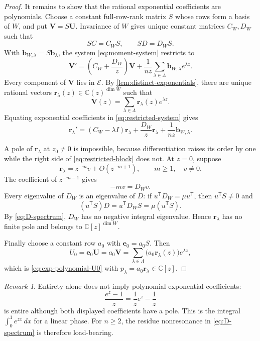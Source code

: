 \documentclass[11pt]{article}
\numberwithin{equation}{section}
\theoremstyle{definition}
\theoremstyle{remark}
\newtheorem{remark}[remark]{Remark}
\newcommand{\C}{\mathbb C}
\newcommand{\Ecal}{\mathcal E}
\begin{document}
\begin{proof}
It remains to show that the rational exponential coefficients are
polynomials.  Choose a constant full-row-rank matrix $S$ whose rows form a
basis of $W$, and put $\mathbf V=S\mathbf U$.  Invariance of $W$ gives unique
constant matrices $C_W,D_W$ such that
\[
  SC=C_WS,
  \qquad
  SD=D_WS.
\]
With $\mathbf b_{W,\lambda}=S\mathbf b_\lambda$, the system
\eqref{eq:moment-system} restricts to
\begin{equation}\label{eq:restricted-system}
  \mathbf V'
  =\left(C_W+\frac{D_W}{z}\right)\mathbf V
   +\frac1{nz}\sum_{\lambda\in\Lambda}
     \mathbf b_{W,\lambda}e^{\lambda z}.
\end{equation}
Every component of $\mathbf V$ lies in $\Ecal$.  By
\cref{lem:distinct-exponentials}, there are unique rational vectors
$\mathbf r_\lambda(z)\in\C(z)^{\dim W}$ such that
\begin{equation}\label{eq:V-expansion}
  \mathbf V(z)=\sum_{\lambda\in\Lambda}
  \mathbf r_\lambda(z)e^{\lambda z}.
\end{equation}
Equating exponential coefficients in \eqref{eq:restricted-system} gives
\begin{equation}\label{eq:restricted-block}
  \mathbf r_\lambda'
  =(C_W-\lambda I)\mathbf r_\lambda
   +\frac{D_W}{z}\mathbf r_\lambda
   +\frac1{nz}\mathbf b_{W,\lambda}.
\end{equation}

A pole of $\mathbf r_\lambda$ at $z_0\ne0$ is impossible, because
differentiation raises its order by one while the right side of
\eqref{eq:restricted-block} does not.  At $z=0$, suppose
\[
  \mathbf r_\lambda=z^{-m}v+O(z^{-m+1}),
  \qquad m\ge1,
  \quad v\ne0.
\]
The coefficient of $z^{-m-1}$ gives
\[
  -mv=D_Wv.
\]
Every eigenvalue of $D_W$ is an eigenvalue of $D$: if
$u^{\mathsf T}D_W=\mu u^{\mathsf T}$, then
$u^{\mathsf T}S\ne0$ and
\[
  (u^{\mathsf T}S)D
  =u^{\mathsf T}D_WS
  =\mu(u^{\mathsf T}S).
\]
By \eqref{eq:D-spectrum}, $D_W$ has no negative integral eigenvalue.  Hence
$\mathbf r_\lambda$ has no finite pole and belongs to
$\C[z]^{\dim W}$.

Finally choose a constant row $a_0$ with $\mathbf e_0=a_0S$.  Then
\[
  U_0=\mathbf e_0\mathbf U=a_0\mathbf V
  =\sum_{\lambda\in\Lambda}
    \bigl(a_0\mathbf r_\lambda(z)\bigr)e^{\lambda z},
\]
which is \eqref{eq:exp-polynomial-U0} with
$p_\lambda=a_0\mathbf r_\lambda\in\C[z]$.
\end{proof}

\begin{remark}\label{rem:entire-rational-coefficients}
Entirety alone does not imply polynomial exponential coefficients:
\[
  \frac{e^z-1}{z}=\frac1z e^z-\frac1z
\]
is entire although both displayed coefficients have a pole.  This is the
integral $\int_0^1e^{zx}\,dx$ for a linear phase.  For $n\ge2$, the residue
nonresonance in \eqref{eq:D-spectrum} is therefore load-bearing.
\end{remark}
\end{document}
